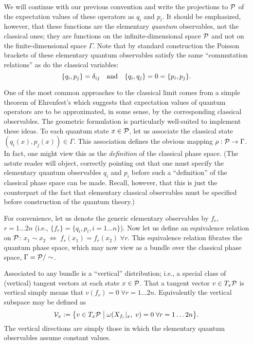 \documentclass[12pt,aps,eqsecnum,tighten,nofootinbib]{revtex4-2}
\def\be{\begin{equation}}
\def\ee{\end{equation}}
\def\iff{\Leftrightarrow}
\def\P{{\cal P}}
\def\w{\omega}
\newcommand{\hvf}[1]{{X_{#1}}}
\begin{document}
We will continue with our previous convention and write the
projections to $\P$ of the expectation values of these operators as
$q_i$ and $p_i$. It should be emphasized, however, that these
functions are the elementary {\em quantum} observables, not the
classical ones; they are functions on the infinite-dimensional space
$\P$ and not on the finite-dimensional space $\Gamma$. Note that by
standard construction the Poisson brackets of these elementary quantum
observables satisfy the same ``commutation relations'' as do the
classical variables:
%
\be \{q_i,
p_j\} = \delta_{ij} \quad {\rm and} \quad \{q_i, q_j\} = 0 = \{p_i,
p_j\}.  
\ee
%

One of the most common approaches to the classical limit comes from a
simple theorem of Ehrenfest's which suggests that expectation values of
quantum operators are to be approximated, in some sense, by the
corresponding classical observables.  The geometric formulation is
particularly well-suited to implement these ideas.  To each
quantum state $x\in\P$, let us associate the classical state $(q_i(x),
p_j(x)) \in \Gamma$.  This association defines the obvious mapping
$\rho:\P \rightarrow \Gamma$.  In fact, one might view this as the
{\em definition} of the classical phase space.  (The astute reader will
object, correctly pointing out that one must specify the elementary
quantum observables $q_i$ and $p_i$ before such a ``definition'' of
the classical phase space can be made. Recall, however, that this is
just the counterpart of the fact that elementary classical observables
must be specified before construction of the quantum theory.)

For convenience, let us denote the generic elementary observables by
$f_r$, $r=1 \ldots 2n$ (i.e., $\{f_r\} = \{q_i, p_i, i=1 \ldots n\}$).
Now let us define an equivalence relation on $\P$: $x_1 \sim x_2 \;
\iff \; f_r(x_1)=f_r(x_2) \; \forall r$.  This equivalence relation
fibrates the quantum phase space, which may now view as a bundle over the
classical phase space, $\Gamma = \P/\sim$.

Associated to any bundle is a ``vertical'' distribution; i.e., a
special class of (vertical) tangent vectors at each state $x\in\P$.
That a tangent vector $v \in T_x\P$ is vertical simply means that
$v(f_r) = 0 \; \forall r=1 \ldots 2n$.  Equivalently the vertical
subspace may be defined as
%
\be
{\cal V}_x := \big\{ v\in T_x \P \; \big| \;
\w(\hvf{f_r}|_x, \; v) = 0 \; \forall r=1 \ldots 2n \big\} .
\ee
%
The vertical directions are simply those in which the elementary
quantum observables assume constant values.
\end{document}
